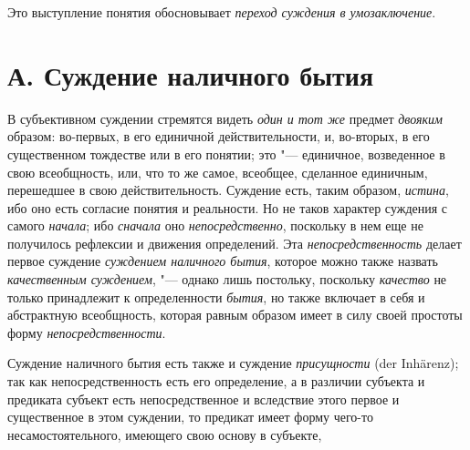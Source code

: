 Это выступление понятия обосновывает
{\em переход суждения в
умозаключение}.

\section[А. Суждение наличного бытия]{А. Суждение наличного бытия}
В субъективном суждении стремятся видеть
{\em один и тот же}
предмет {\em двояким}
образом: во-первых, в его единичной действительности, и,
во-вторых, в его существенном тождестве или в его понятии; это
"--- единичное, возведенное в свою всеобщность, или, что то же
самое, всеобщее, сделанное единичным, перешедшее в свою действительность.
Суждение есть, таким образом,
{\em истина}, ибо оно
есть согласие понятия и реальности. Но не таков характер суждения с самого
{\em начала}; ибо
{\em сначала} оно
{\em непосредственно},
поскольку в нем еще не получилось рефлексии и движения
определений. Эта
{\em непосредственность}
делает первое суждение
{\em суждением наличного бытия},
которое можно также назвать
{\em качественным суждением}, "---
однако лишь постольку, поскольку
{\em качество} не только
принадлежит к определенности
{\em бытия}, но также
включает в себя и абстрактную всеобщность, которая равным образом имеет в
силу своей простоты форму
{\em непосредственности}.

Суждение наличного бытия есть также и суждение
{\em присущности} (der Inhärenz);
так как непосредственность есть его определение, а в различии
субъекта и предиката субъект есть непосредственное и
вследствие этого первое и существенное в этом суждении, то
предикат имеет форму чего-то несамостоятельного, имеющего свою основу в
субъекте,

